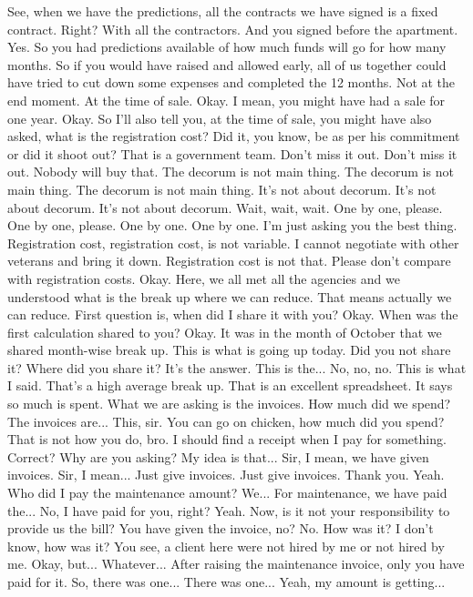 See, when we have the predictions,
all the contracts we have signed is a fixed contract.
Right?
With all the contractors.
And you signed before the apartment.
Yes.
So you had predictions available of how much funds
will go for how many months.
So if you would have raised and allowed early,
all of us together could have tried to cut down some expenses
and completed the 12 months.
Not at the end moment.
At the time of sale.
Okay.
I mean, you might have had a sale for one year.
Okay.
So I'll also tell you,
at the time of sale, you might have also asked,
what is the registration cost?
Did it, you know, be as per his commitment or did it shoot out?
That is a government team.
Don't miss it out.
Don't miss it out.
Nobody will buy that.
The decorum is not main thing.
The decorum is not main thing.
The decorum is not main thing.
It's not about decorum.
It's not about decorum.
It's not about decorum.
Wait, wait, wait.
One by one, please.
One by one, please.
One by one.
One by one.
I'm just asking you the best thing.
Registration cost,
registration cost,
is not variable.
I cannot negotiate with other veterans
and bring it down.
Registration cost is not that.
Please don't compare with registration costs.
Okay.
Here, we all met all the agencies
and we understood what is the break up
where we can reduce.
That means actually we can reduce.
First question is,
when did I share it with you?
Okay.
When was the first calculation shared to you?
Okay.
It was in the month of October
that we shared month-wise break up.
This is what is going up today.
Did you not share it?
Where did you share it?
It's the answer.
This is the...
No, no, no.
This is what I said.
That's a high average break up.
That is an excellent spreadsheet.
It says so much is spent.
What we are asking is the invoices.
How much did we spend?
The invoices are...
This, sir.
You can go on chicken,
how much did you spend?
That is not how you do, bro.
I should find a receipt
when I pay for something.
Correct?
Why are you asking?
My idea is that...
Sir, I mean, we have given invoices.
Sir, I mean...
Just give invoices.
Just give invoices.
Thank you.
Yeah.
Who did I pay the maintenance amount?
We...
For maintenance, we have paid the...
No, I have paid for you, right?
Yeah.
Now, is it not your responsibility
to provide us the bill?
You have given the invoice, no?
No.
How was it?
I don't know, how was it?
You see, a client here
were not hired by me
or not hired by me.
Okay, but...
Whatever...
After raising the maintenance invoice,
only you have paid for it.
So, there was one...
There was one...
Yeah, my amount is getting...
